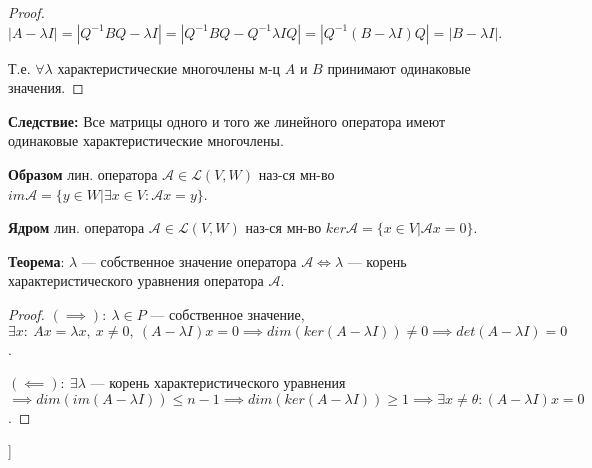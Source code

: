 \begin{proof}
$|A - \lambda I| = |Q^{-1} B Q - \lambda I| = |Q^{-1} B Q - Q^{-1} \lambda I Q| = |Q^{-1} (B - \lambda I) Q| = |B - \lambda I|$. 

Т.е. $\forall \lambda$ характеристические многочлены м-ц $A$ и $B$ принимают одинаковые значения.
\end{proof}

\textbf{Следствие:} Все матрицы одного и того же линейного оператора имеют одинаковые характеристические многочлены.

\bigbreak

\textbf{Образом} лин. оператора $\mathcal{A} \in \mathcal{L}(V, W)$ наз-ся мн-во $im\mathcal{A} = \{y \in W | \exists x \in V : \mathcal{A}x=y \}$.

\textbf{Ядром} лин. оператора $\mathcal{A} \in \mathcal{L}(V, W)$ наз-ся мн-во $ker\mathcal{A} = \{x \in V | \mathcal{A}x=0 \}$.

\textbf{Теорема}: $\lambda$ --- собственное значение оператора $\mathcal{A} \iff \lambda$ --- корень характеристического уравнения оператора $\mathcal{A}$.

\begin{proof}
 $(\implies):~\lambda \in P$ --- собственное значение, $\exists x:~Ax = \lambda x,~x\neq 0,~(A - \lambda I)x = 0 \implies
    dim(ker(A - \lambda I))\neq 0 \implies det(A - \lambda I) = 0$.

    $(\impliedby):~\exists\lambda$ --- корень характеристического уравнения $\implies dim(im(A - \lambda I))
    \leqslant n - 1 \implies dim(ker(A - \lambda I)) \geqslant 1 \implies \exists x\neq\theta : (A - \lambda I)x = 0$.
\end{proof}



\bigbreak
[\cite[page 240-260]{kim}]